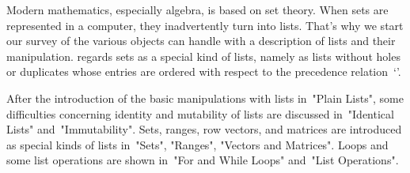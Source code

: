 


Modern mathematics, especially algebra, is based on set theory. When sets
are represented in a computer, they inadvertently turn into lists. That's
why we start our  survey of the various  objects {\GAP} can handle with a
description of  lists  and their  manipulation. {\GAP}  regards sets as a
special kind of lists, namely as lists without  holes or duplicates whose
entries are ordered with respect to the precedence relation~`\<'.

After  the introduction of  the basic  manipulations with lists in~"Plain
Lists", some difficulties concerning identity and mutability of lists are
discussed  in~"Identical  Lists"  and~"Immutability".  Sets,  ranges, row
vectors, and matrices are introduced as special kinds of lists in~"Sets",
"Ranges", "Vectors and Matrices".   Loops  and some list   operations are
shown in~"For and While Loops" and~"List Operations".

\null

